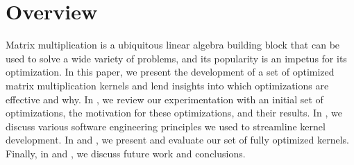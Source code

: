 \section{Overview}
Matrix multiplication is a ubiquitous linear algebra building block that can be
used to solve a wide variety of problems, and its popularity is an impetus for
its optimization. In this paper, we present the development of a set of
optimized matrix multiplication kernels and lend insights into which
optimizations are effective and why. In , we review our
experimentation with an initial set of optimizations, the motivation for these
optimizations, and their results. In , we discuss various
software engineering principles we used to streamline kernel development. In
 and , we present and evaluate our set of fully
optimized kernels.  Finally, in  and , we discuss
future work and conclusions.

